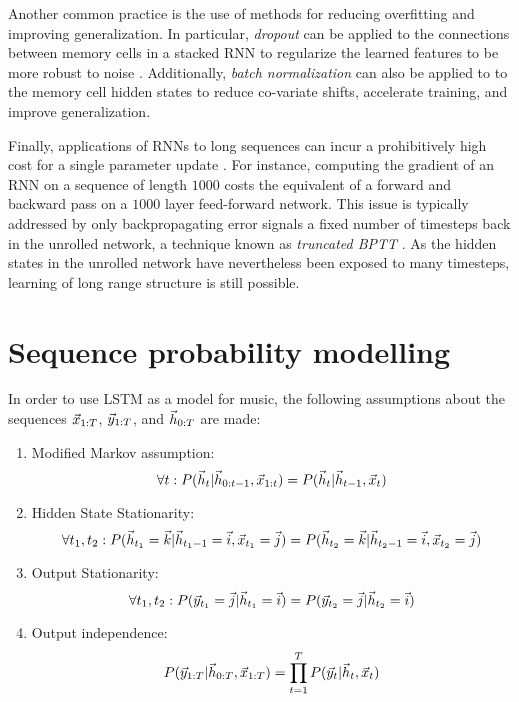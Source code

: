 Another common practice is the use of methods for reducing overfitting and
improving generalization. In particular, \emph{dropout}
\citep{srivastava2014dropout} can be applied to the connections between memory
cells in a stacked RNN to regularize the learned features to be more robust to
noise \citep{zaremba2014recurrent}. Additionally, \emph{batch normalization}
\citep{ioffe2015batch} can also be applied to to the memory cell hidden states
to reduce co-variate shifts, accelerate training, and improve generalization.

Finally, applications of RNNs to long sequences can incur a prohibitively high
cost for a single parameter update \citep{citeulike:13881859}. For instance,
computing the gradient of an RNN on a sequence of length $1000$ costs the
equivalent of a forward and backward pass on a $1000$ layer feed-forward
network. This issue is typically addressed by only backpropagating error
signals a fixed number of timesteps back in the unrolled network, a technique
known as \emph{truncated BPTT} \citep{williams1990efficient}. As the hidden
states in the unrolled network have nevertheless been exposed to many
timesteps, learning of long range structure is still possible.

\section{Sequence probability modelling}


In order to use LSTM as a model for music, the following assumptions
about the sequences $\vec{x}_{1:T}$, $\vec{y}_{1:T}$, and $\vec{h}_{0:T}$ are made:
\begin{enumerate}
  \item Modified Markov assumption:
    \begin{equation}
      \label{eq:modified-markov}
      \forall t: P(\vec{h}_t | \vec{h}_{0:t-1}, \vec{x}_{1:t}) = P(\vec{h}_t | \vec{h}_{t-1}, \vec{x}_t)
    \end{equation}
  \item Hidden State Stationarity:
    \begin{equation}
      \label{eq:hidden-state-stationarity}
      \forall t_1, t_2: P(\vec{h}_{t_1} = \vec{k} | \vec{h}_{t_{1}-1} = \vec{i}, \vec{x}_{t_1} = \vec{j}) = P(\vec{h}_{t_2} = \vec{k} | \vec{h}_{t_{2}-1} = \vec{i}, \vec{x}_{t_2} = \vec{j})
   \end{equation}
  \item Output Stationarity:
    \begin{equation}
      \label{eq:output-stationarity}
      \forall t_1, t_2: P(\vec{y}_{t_1} = \vec{j} | \vec{h}_{t_1} = \vec{i}) = P(\vec{y}_{t_2} = \vec{j} | \vec{h}_{t_2} = \vec{i})
   \end{equation}
  \item Output independence:
   \begin{equation}
     \label{eq:output-independence}
     P(\vec{y}_{1:T} | \vec{h}_{0:T}, \vec{x}_{1:T}) = \prod_{t=1}^T P(\vec{y}_t | \vec{h}_{t}, \vec{x}_t)
   \end{equation}
\end{enumerate}


